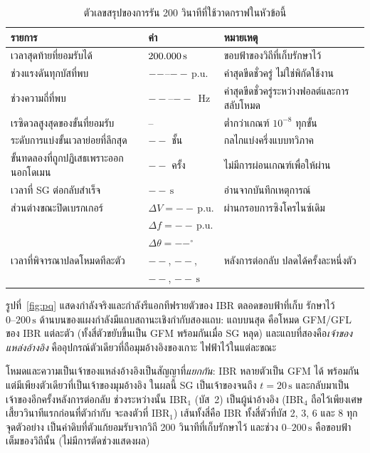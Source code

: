 \documentclass[12pt,a4paper]{article}
\newcommand{\pu}{\,\mathrm{p.u.}}
\newcommand{\second}{\,\mathrm{s}}
\newcommand{\NewRunVMax}{--}\newcommand{\NewRunFMin}{--}%
\newcommand{\NewRunFMax}{--}\newcommand{\NewRunSubdivision}{--}%
\newcommand{\NewRunDomainRejects}{--}\newcommand{\NewRunResidual}{--}%
\newcommand{\NewRunReclose}{--}\newcommand{\NewRunFirstRelease}{--}%
\newcommand{\NewRunReleaseOne}{--}\newcommand{\NewRunReleaseTwo}{--}%
\newcommand{\NewRunReleaseThree}{--}\newcommand{\NewRunReleaseFour}{--}%
\newcommand{\NewRunSyncDV}{--}\newcommand{\NewRunSyncDF}{--}%
\newcommand{\NewRunSyncDTheta}{--}}
\begin{document}
\begin{table}[H]
\centering\footnotesize
\caption{ตัวเลขสรุปของการรัน 200 วินาทีที่ใช้วาดกราฟในหัวข้อนี้}
\label{tab:runscalars}
\begin{tabularx}{\textwidth}{@{}>{\raggedright\arraybackslash}p{}l X@{}}
\toprule
รายการ & ค่า & หมายเหตุ \\ \midrule
เวลาสุดท้ายที่ยอมรับได้ & $\NewRunEnd\second$ & ขอบฟ้าของวิถีที่เก็บรักษาไว้ \\
ช่วงแรงดันทุกบัสที่พบ & $--$--$\NewRunVMax\pu$ & ค่าสุดขีดชั่วครู่ ไม่ใช่พิกัดใช้งาน \\
ช่วงความถี่ที่พบ & $\NewRunFMin$--$\NewRunFMax$~Hz & ค่าสุดขีดชั่วครู่ระหว่างฟอลต์และการสลับโหมด \\
เรซิดวลสูงสุดของขั้นที่ยอมรับ & \NewRunResidual & ต่ำกว่าเกณฑ์ $10^{-8}$ ทุกขั้น \\
ระดับการแบ่งขั้นเวลาย่อยที่ลึกสุด & $\NewRunSubdivision$ ชั้น & กลไกแบ่งครึ่งแบบทวิภาค \\
ขั้นทดลองที่ถูกปฏิเสธเพราะออกนอกโดเมน & $\NewRunDomainRejects$ ครั้ง & ไม่มีการผ่อนเกณฑ์เพื่อให้ผ่าน \\
เวลาที่ SG ต่อกลับสำเร็จ & $\NewRunReclose\second$ & อ่านจากบันทึกเหตุการณ์ \\
ส่วนต่างขณะปิดเบรกเกอร์ & $\Delta V=\NewRunSyncDV\pu$ & ผ่านกรอบการซิงโครไนซ์เดิม \\
 & $\Delta f=\NewRunSyncDF\pu$ & \\
 & $\Delta\theta=\NewRunSyncDTheta^{\circ}$ & \\
เวลาที่พิจารณาปลดโหมดทีละตัว &
$\NewRunReleaseOne$, $\NewRunReleaseTwo$, & หลังการต่อกลับ ปลดได้ครั้งละหนึ่งตัว \\
 & $\NewRunReleaseThree$, $\NewRunReleaseFour\second$ & \\
\bottomrule
\end{tabularx}
\end{table}

รูปที่~\ref{fig:pq} แสดงกำลังจริงและกำลังรีแอกทีฟรายตัวของ IBR ตลอดขอบฟ้าที่เก็บ
รักษาไว้ $0\text{--}200\second$ ด้านบนของแผงกำลังมีแถบสถานะเชิงกำกับสองแถบ: แถบบนสุด
คือโหมด GFM/GFL ของ IBR แต่ละตัว (ทั้งสี่ตัวขยับขึ้นเป็น GFM พร้อมกันเมื่อ SG หลุด)
และแถบที่สองคือ\emph{เจ้าของแหล่งอ้างอิง} คืออุปกรณ์ตัวเดียวที่ถือมุมอ้างอิงของเกาะ
ไฟฟ้าไว้ในแต่ละขณะ

โหมดและความเป็นเจ้าของแหล่งอ้างอิงเป็นสัญญาที่\emph{แยกกัน}: IBR หลายตัวเป็น GFM ได้
พร้อมกัน แต่มีเพียงตัวเดียวที่เป็นเจ้าของมุมอ้างอิง ในผลนี้ SG เป็นเจ้าของจนถึง
$t=20\second$ และกลับมาเป็นเจ้าของอีกครั้งหลังการต่อกลับ ช่วงระหว่างนั้น
IBR$_1$ (บัส~2) เป็นผู้นำอ้างอิง (IBR$_4$ ถือไว้เพียงเศษเสี้ยววินาทีแรกก่อนที่ตัวกำกับ
จะลงตัวที่ IBR$_1$) เส้นทั้งสี่คือ IBR ทั้งสี่ตัวที่บัส 2, 3, 6 และ 8 ทุกจุดตัวอย่าง
เป็นค่าดิบที่ตัวแก้ยอมรับจากวิถี 200 วินาทีที่เก็บรักษาไว้ และช่วง
$0\text{--}200\second$ คือขอบฟ้าเต็มของวิถีนั้น (ไม่มีการตัดช่วงแสดงผล)
\end{document}
